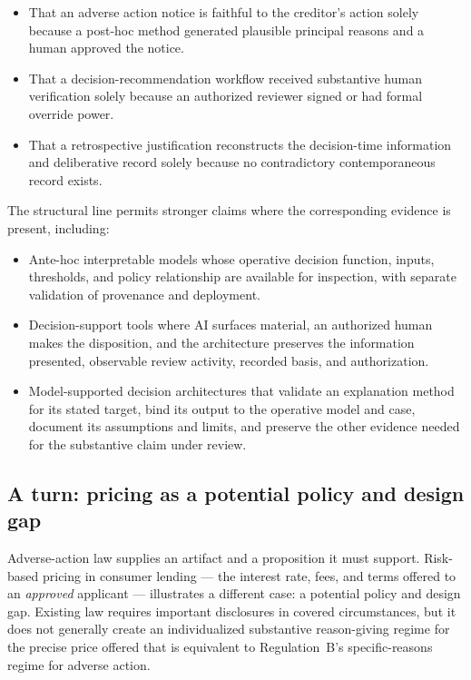 \begin{itemize}
\item That an adverse action notice is faithful to the creditor's action solely because a post-hoc method generated plausible principal reasons and a human approved the notice.

\item That a decision-recommendation workflow received substantive human verification solely because an authorized reviewer signed or had formal override power.

\item That a retrospective justification reconstructs the decision-time information and deliberative record solely because no contradictory contemporaneous record exists.
\end{itemize}

The structural line permits stronger claims where the corresponding evidence is present, including:

\begin{itemize}
\item Ante-hoc interpretable models whose operative decision function, inputs, thresholds, and policy relationship are available for inspection, with separate validation of provenance and deployment.

\item Decision-support tools where AI surfaces material, an authorized human makes the disposition, and the architecture preserves the information presented, observable review activity, recorded basis, and authorization.

\item Model-supported decision architectures that validate an explanation method for its stated target, bind its output to the operative model and case, document its assumptions and limits, and preserve the other evidence needed for the substantive claim under review.
\end{itemize}

\subsection{A turn: pricing as a potential policy and design gap}
\label{sec:verification-regimes:pricing-turn}

Adverse-action law supplies an artifact and a proposition it must support. Risk-based pricing in consumer lending --- the interest rate, fees, and terms offered to an \emph{approved} applicant --- illustrates a different case: a potential policy and design gap. Existing law requires important disclosures in covered circumstances, but it does not generally create an individualized substantive reason-giving regime for the precise price offered that is equivalent to Regulation~B's specific-reasons regime for adverse action.

